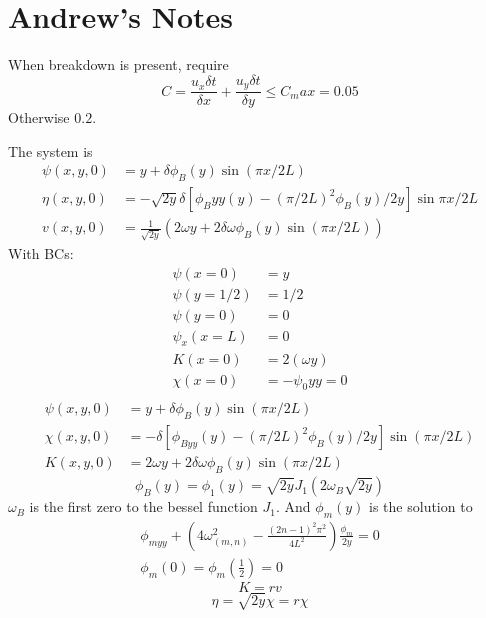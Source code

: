 \documentclass{X:/Documents/Coding/Latex/myreport}
\begin{document}
\section{Andrew's Notes}


When breakdown is present, require
\[C = \frac{u_x \delta t}{\delta x} + \frac{u_y \delta t}{\delta y} \leq C_max = 0.05\]
Otherwise $0.2$.


The system is
\begin{align*}
    \psi(x,y,0) &= y + \delta \phi_B(y) \sin (\pi x / 2L)\\
    \eta(x,y,0) &= -\sqrt{2y} \delta \left[\phi_B{yy}(y) - (\pi/2L)^2 \phi_B(y)/2y\right]\sin \pi x/2L\\
    v(x,y,0) &= \frac{1}{\sqrt{2y}} \left(2 \omega y + 2 \delta \omega \phi_B(y) \sin(\pi x/2L)\right)
\end{align*}
With BCs:
\begin{align*}
    \psi(x=0) &= y\\
    \psi(y=1/2) &= 1/2\\
    \psi(y=0) &= 0\\
    \psi_x(x=L) &= 0 \\
    K(x=0) &= 2(\omega y)\\
    \chi(x=0) &= - \psi_0{yy} = 0\\
\end{align*}
\begin{align*}
  \psi(x,y,0) &= y + \delta \phi_B(y) \sin(\pi x/2L)\\
  \chi(x,y,0) &= -\delta[\phi_{Byy}(y) -(\pi/2L)^2 \phi_B(y)/2y]\sin(\pi x/2L)\\
  K(x,y,0) &= 2 \omega y + 2  \delta \omega \phi_B(y) \sin (\pi x/2L)
\end{align*}
\[\phi_B(y) = \phi_1(y) = \sqrt{2y} J_1(2\omega_B \sqrt{2y})\]
$\omega_B$ is the first zero to the bessel function $J_1$.
And $\phi_{m}(y)$ is the solution to
\begin{align*}
    \phi_{myy} + \left(4 \omega^2_{(m,n)} - \frac{(2n -1)^2 \pi^2}{4L^2}\right) \frac{\phi_m}{2y} = 0\\
    \phi_m(0) = \phi_m(\frac12) = 0
\end{align*}
\[K = rv\]
\[\eta = \sqrt{2y} \chi = r \chi \]
\end{document}
